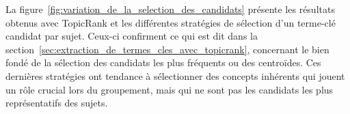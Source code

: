     La figure~\ref{fig:variation_de_la_selection_des_candidats} présente les
    résultats obtenus avec TopicRank et les différentes stratégies de sélection
    d'un terme-clé candidat par sujet. Ceux-ci confirment ce qui est dit dans la
    section~\ref{sec:extraction_de_termes_cles_avec_topicrank}, concernant le
    bien fondé de la sélection des candidats les plus fréquents ou des
    centroïdes. Ces dernières stratégies ont tendance à sélectionner des
    concepts inhérents qui jouent un rôle crucial lors du groupement, mais qui
    ne sont pas les candidats les plus représentatifs des sujets.

